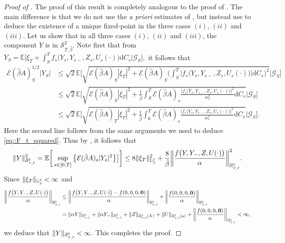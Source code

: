 \documentclass[10pt]{article} %
\newcommand\cE{\mathcal E}
\newcommand\cG{\mathcal G}
\newcommand\cS{\mathcal S}
\newcommand{\smalltext}[1]{\text{\fontsize{4}{4}\selectfont$#1$}}
\def \E{\mathbb{E}}
\def \H{\mathbb{H}}
\def \L{\mathbb{L}}
\def\d{\mathrm{d}}
\begin{document}
\begin{proof}[Proof of ]
	The proof of this result is completely analogous to the proof of . The main difference is that we do not use the \emph{a priori} estimates of , but instead use  to deduce the existence of a unique fixed-point in the three cases $(i)$, $(ii)$ and $(iii)$. Let us show that in all three cases $(i)$, $(ii)$ and $(iii)$, the component $Y$ is in $\cS^2_{T,\hat\beta}$. Note first that from $Y_S = \E\big[\xi_T + \int_S^T f_s\big(Y_s,Y_{s-},Z_s,U_s(\cdot)\big)\d C_s \big| \cG_S\big],$ it follows that
	\begin{align*}
		\cE(\hat\beta A)^{1/2}_S|Y_S| 
		&\leq \sqrt{2}\E\Bigg[\sqrt{\cE(\hat\beta A)_S|\xi_T|^2 + \cE(\hat\beta A)_S\bigg(\int_S^T  \big|f_s\big(Y_s,Y_{s-},Z_s,U_s(\cdot)\big)\big|\d C_s\bigg)^2} \Bigg| \cG_S\Bigg] \\
		&\leq \sqrt{2}\E\Bigg[\sqrt{\cE(\hat\beta A)_S|\xi_T|^2 + \frac{1}{\hat\beta}\int_S^T \cE(\hat\beta A)_s \frac{\big|f_s\big(Y_s,Y_{s-},Z_s,U_s(\cdot)\big)\big|^2}{\alpha^2_s}\d C_s} \Bigg| \cG_S\Bigg] \\
		&\leq \sqrt{2}\E\Bigg[\sqrt{\cE(\hat\beta A)_T|\xi_T|^2 + \frac{1}{\hat\beta}\int_0^T \cE(\hat\beta A)_s \frac{\big|f_s\big(Y_s,Y_{s-},Z_s,U_s(\cdot)\big)\big|^2}{\alpha^2_s}\d C_s} \Bigg| \cG_S\Bigg].
	\end{align*}
	Here the second line follows from the same arguments we used to deduce \eqref{eq::F_t_squared}.
	Thus by , it follows that
	\begin{equation*}
		\|Y\|^2_{\cS^\smalltext{2}_{\smalltext{T}\smalltext{,}\smalltext{\hat\beta}}} 
		= \E\bigg[\sup_{s \in [0,T]}\big\{\cE(\hat\beta A)_s|Y_s|^2\big\}\big]\bigg] 
		\leq 8 \|\xi_T\|^2_{\L^\smalltext{2}_\smalltext{\hat\beta}} + \frac{8}{\hat\beta} \bigg\|\frac{f\big(Y,Y_-,Z,U(\cdot)\big)}{\alpha}\bigg\|^2_{\H^\smalltext{2}_{\smalltext{T}\smalltext{,}\smalltext{\hat\beta}}}.
	\end{equation*}
	Since $\|\xi_T\|_{\L^\smalltext{2}_\smalltext{\hat\beta}} < \infty$ and 
	\begin{align*}
		\bigg\|\frac{f\big(Y,Y_-,Z,U(\cdot)\big)}{\alpha}\bigg\|_{\H^\smalltext{2}_{\smalltext{T}\smalltext{,}\smalltext{\hat\beta}}} 
		&\leq \bigg\|\frac{f\big(Y,Y_-,Z,U(\cdot)\big)-f(0,0,0,\mathbf{0})}{\alpha}\bigg\|_{\H^\smalltext{2}_{\smalltext{T}\smalltext{,}\smalltext{\hat\beta}}} + \bigg\|\frac{f(0,0,0,\mathbf{0})}{\alpha}\bigg\|_{\H^\smalltext{2}_{\smalltext{T}\smalltext{,}\smalltext{\hat\beta}}} \\
		&= \|\alpha Y\|_{\H^\smalltext{2}_{\smalltext{T}\smalltext{,}\smalltext{\hat\beta}}} + \|\alpha Y_-\|_{\H^\smalltext{2}_{\smalltext{T}\smalltext{,}\smalltext{\hat\beta}}} + \|Z\|_{\H^\smalltext{2}_{\smalltext{T}\smalltext{,}\smalltext{\hat\beta}}(X)} + \|U\|_{\H^\smalltext{2}_{\smalltext{T}\smalltext{,}\smalltext{\hat\beta}}(\mu)} + \bigg\|\frac{f(0,0,0,\mathbf{0})}{\alpha}\bigg\|_{\H^\smalltext{2}_{\smalltext{T}\smalltext{,}\smalltext{\hat\beta}}} < \infty,
	\end{align*}
	we deduce that $\|Y\|_{\cS^\smalltext{2}_{\smalltext{T}\smalltext{,}\smalltext{\hat\beta}}} < \infty$. This completes the proof.
	

\end{proof}
\end{document}
